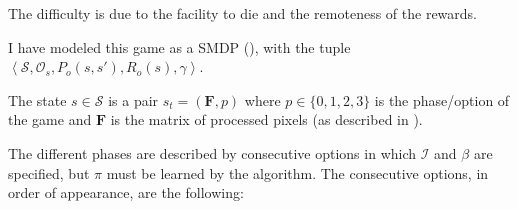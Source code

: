 The difficulty is due to the facility to die and the remoteness of the rewards.

I have modeled this game as a \ac{SMDP} (),
with the tuple $\left< \mathcal{S}, \mathcal{O}_s, P_o(s,s'), R_o(s),\gamma \right>$.

The state $s \in \mathcal{S}$ is a pair $s_t = (\mathbf{F}, p)$ where $p \in \{0,1,2,3\}$ is the phase/option of the game and
$\mathbf{F}$ is the matrix of processed pixels (as described in ).

The different phases are described by consecutive options in which $\mathcal{I}$ and $\beta$ are specified, but $\pi$
must be learned by the algorithm.
The consecutive options, in order of appearance, are the following:
